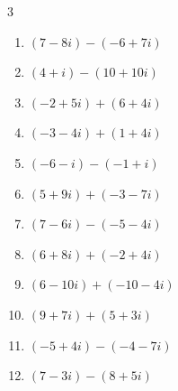 \begin{multicols}{3}
\begin{enumerate}
        \phantom{$\displaystyle =-2$}

  \item $\displaystyle (7-8i) - (-6+7i)$

        \phantom{$\displaystyle =13-15i$}

  \item $\displaystyle (4+i) - (10+10i)$

        \phantom{$\displaystyle =-6-9i$}

  \item $\displaystyle (-2+5i) + (6+4i)$

        \phantom{$\displaystyle =4+9i$}

  \item $\displaystyle (-3-4i) + (1+4i)$

        \phantom{$\displaystyle =-2$}

  \item $\displaystyle (-6-i) - (-1+i)$

        \phantom{$\displaystyle =-5-2i$}

  \item $\displaystyle (5+9i) + (-3-7i)$

        \phantom{$\displaystyle =2+2i$}

\columnbreak %

\resetques

  \item $\displaystyle (7-6i) - (-5-4i)$

        \phantom{$\displaystyle =12-2i$}

  \item $\displaystyle (6+8i) + (-2+4i)$

        \phantom{$\displaystyle =4+12i$}

  \item $\displaystyle (6-10i) + (-10-4i)$

        \phantom{$\displaystyle =-4-14i$}

  \item $\displaystyle (9+7i) + (5+3i)$

        \phantom{$\displaystyle =14+10i$}

  \item $\displaystyle (-5+4i) - (-4-7i)$

        \phantom{$\displaystyle =-1+11i$}

  \item $\displaystyle (7-3i) - (8+5i)$

        \phantom{$\displaystyle =-1-8i$}


\end{enumerate}
\end{multicols}
